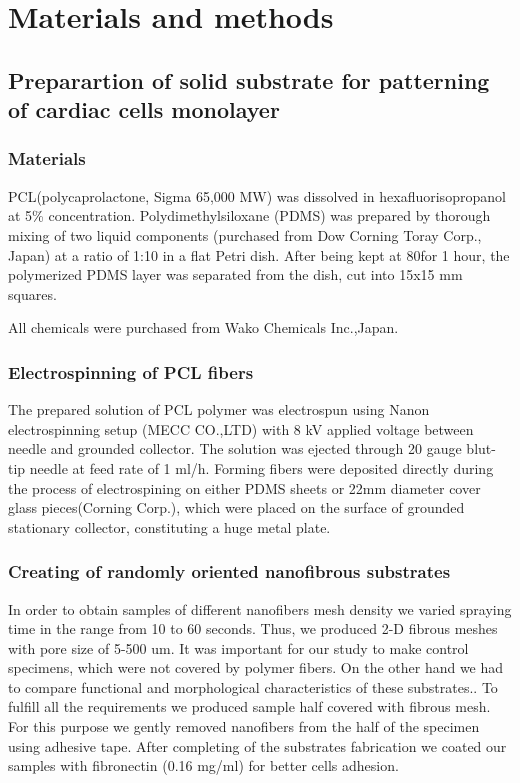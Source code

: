 \section{Materials and methods}
\label{sec:methods}

\subsection{Preparartion of solid substrate for patterning of cardiac cells monolayer}
\subsubsection{Materials}
	\label{sec:specimen_preparation_electrospinning}


PCL(polycaprolactone, Sigma 65,000 MW) was dissolved in hexafluorisopropanol at 5\% concentration.  
Polydimethylsiloxane (PDMS) was prepared by thorough mixing of two liquid components (purchased from Dow Corning Toray Corp., Japan) at a ratio of 1:10 in a flat Petri dish.
 After being kept at 80\gc\space for 1 hour, the polymerized PDMS layer was separated from the dish, cut into 15x15 mm squares.

All chemicals were purchased from Wako Chemicals Inc.,Japan.
\subsubsection{Electrospinning of PCL fibers}
The prepared solution of PCL polymer was electrospun using Nanon electrospinning setup (MECC CO.,LTD) with 8 kV applied voltage between needle and grounded collector.
 The solution was ejected through 20 gauge blut-tip needle at feed rate of 1 ml/h. 
 Forming fibers were deposited directly during the process of electrospining on either PDMS sheets or 22mm diameter cover glass pieces(Corning Corp.), which were placed on the surface of grounded stationary collector, constituting a huge metal plate.    
\subsubsection{Creating of randomly oriented nanofibrous substrates}
In order to obtain samples of different nanofibers mesh density we varied spraying time in the range from 10 to 60 seconds.
Thus, we produced 2-D fibrous meshes with pore size of 5-500 um. 
It was important for our study to make control specimens, which were not covered by polymer fibers.
On the other hand we had to compare functional and morphological characteristics of these substrates..
To fulfill all the requirements we produced sample half covered with fibrous mesh.
For this purpose we gently removed nanofibers from the half of the specimen using adhesive tape.
After completing of the substrates fabrication we coated our samples with fibronectin (0.16 mg/ml) for better cells adhesion.
